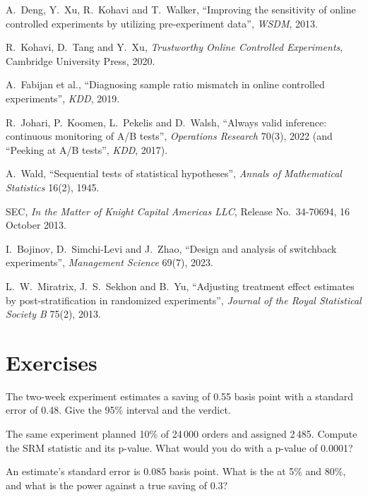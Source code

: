 \begin{omsources}
\item A.~Deng, Y.~Xu, R.~Kohavi and T.~Walker, ``Improving the sensitivity of online controlled experiments by utilizing pre-experiment data'', \emph{WSDM}, 2013.
\item R.~Kohavi, D.~Tang and Y.~Xu, \emph{Trustworthy Online Controlled Experiments}, Cambridge University Press, 2020.
\item A.~Fabijan et al., ``Diagnosing sample ratio mismatch in online controlled experiments'', \emph{KDD}, 2019.
\item R.~Johari, P.~Koomen, L.~Pekelis and D.~Walsh, ``Always valid inference: continuous monitoring of A/B tests'', \emph{Operations Research} 70(3), 2022
(and ``Peeking at A/B tests'', \emph{KDD}, 2017).
\item A.~Wald, ``Sequential tests of statistical hypotheses'', \emph{Annals of Mathematical Statistics} 16(2), 1945.
\item SEC, \emph{In the Matter of Knight Capital Americas LLC}, Release No.~34-70694, 16 October 2013.
\item I.~Bojinov, D.~Simchi-Levi and J.~Zhao, ``Design and analysis of switchback experiments'', \emph{Management Science} 69(7), 2023.
\item L.~W.~Miratrix, J.~S.~Sekhon and B.~Yu, ``Adjusting treatment effect estimates by post-stratification in randomized experiments'', \emph{Journal of the
Royal Statistical Society B} 75(2), 2013.
\end{omsources}

\section{Exercises}

\begin{exercise}[$\star$]\label{exo:rs:live-experiments:1}
The two-week experiment estimates a saving of 0.55 basis point with a standard error of 0.48. Give the 95\% interval and the verdict.
\end{exercise}

\begin{exercise}[$\star$]\label{exo:rs:live-experiments:2}
The same experiment planned 10\% of 24\,000 orders and assigned 2\,485. Compute the SRM statistic and its p-value. What would you do with a p-value of 0.0001?
\end{exercise}

\begin{exercise}[$\star$]\label{exo:rs:live-experiments:3}
An estimate's standard error is 0.085 basis point. What is the  at 5\% and 80\%, and what is the power against a true saving of 0.3?
\end{exercise}

